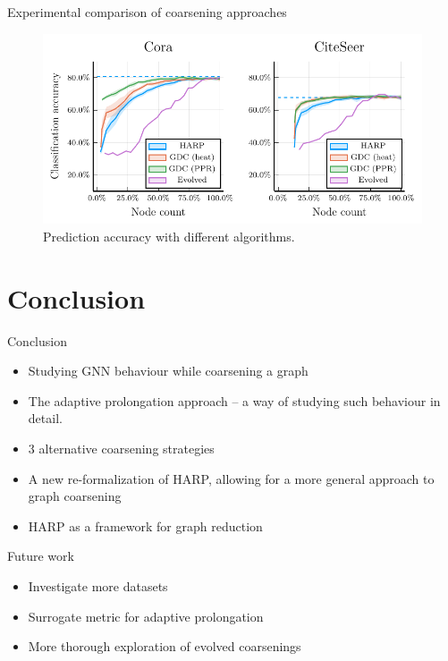 \documentclass[10pt, aspectratio=169]{beamer}
\begin{document}
\begin{frame}{Experimental comparison of coarsening approaches}
	\begin{figure}
		\centering
		\includegraphics[width=\textwidth]{images/coarsening-algorithms/coarsening-algorithms.pdf}
		\caption{Prediction accuracy with different algorithms.}
	\end{figure}
\end{frame}

\section{Conclusion}

\begin{frame}{Conclusion}
	\centering
	\begin{itemize}
		\item Studying GNN behaviour while coarsening a graph
		\item The adaptive prolongation approach -- a way of studying such behaviour in detail.
		\item 3 alternative coarsening strategies
		\item A new re-formalization of HARP, allowing for a more general approach to graph coarsening
		\item HARP as a framework for graph reduction
	\end{itemize}
\end{frame}

\begin{frame}{Future work}
	\centering
	\begin{itemize}
		\item Investigate more datasets
		\item Surrogate metric for adaptive prolongation
		\item More thorough exploration of evolved coarsenings
	\end{itemize}
\end{frame}
\end{document}
